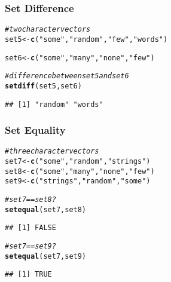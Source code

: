 \documentclass[12pt]{beamer}\usepackage[]{graphicx}\usepackage[]{color}
\makeatletter
\newcommand{\hlstr}[1]{\textcolor[rgb]{0.192,0.494,0.8}{#1}}%
\newcommand{\hlcom}[1]{\textcolor[rgb]{0.678,0.584,0.686}{\textit{#1}}}%
\newcommand{\hlstd}[1]{\textcolor[rgb]{0.345,0.345,0.345}{#1}}%
\newcommand{\hlkwb}[1]{\textcolor[rgb]{0.69,0.353,0.396}{#1}}%
\newcommand{\hlkwd}[1]{\textcolor[rgb]{0.737,0.353,0.396}{\textbf{#1}}}%
\newenvironment{kframe}{%
 \def\at@end@of@kframe{}%
 \ifinner\ifhmode%
  \def\at@end@of@kframe{\end{minipage}}%
  \begin{minipage}{\columnwidth}%
 \fi\fi%
 \def\FrameCommand##1{\hskip\@totalleftmargin \hskip-\fboxsep
 \colorbox{shadecolor}{##1}\hskip-\fboxsep
     \hskip-\linewidth \hskip-\@totalleftmargin \hskip\columnwidth}%
 \MakeFramed {\advance\hsize-\width
   \@totalleftmargin\z@ \linewidth\hsize
   \@setminipage}}%
 {\par\unskip\endMakeFramed%
 \at@end@of@kframe}
\newenvironment{knitrout}{}{} %
\makeatother
\begin{document}

\begin{frame}[fragile]
\frametitle{Set Difference}

\begin{knitrout}\footnotesize
{}\color{fgcolor}\begin{kframe}
\begin{alltt}
\hlcom{# two character vectors}
\hlstd{set5} \hlkwb{<-} \hlkwd{c}\hlstd{(}\hlstr{"some"}\hlstd{,} \hlstr{"random"}\hlstd{,} \hlstr{"few"}\hlstd{,} \hlstr{"words"}\hlstd{)}

\hlstd{set6} \hlkwb{<-} \hlkwd{c}\hlstd{(}\hlstr{"some"}\hlstd{,} \hlstr{"many"}\hlstd{,} \hlstr{"none"}\hlstd{,} \hlstr{"few"}\hlstd{)}

\hlcom{# difference between set5 and set6}
\hlkwd{setdiff}\hlstd{(set5, set6)}
\end{alltt}
\begin{verbatim}
## [1] "random" "words"
\end{verbatim}
\end{kframe}
\end{knitrout}

\end{frame}


\begin{frame}[fragile]
\frametitle{Set Equality}

\begin{knitrout}\footnotesize
{}\color{fgcolor}\begin{kframe}
\begin{alltt}
\hlcom{# three character vectors}
\hlstd{set7} \hlkwb{<-} \hlkwd{c}\hlstd{(}\hlstr{"some"}\hlstd{,} \hlstr{"random"}\hlstd{,} \hlstr{"strings"}\hlstd{)}
\hlstd{set8} \hlkwb{<-} \hlkwd{c}\hlstd{(}\hlstr{"some"}\hlstd{,} \hlstr{"many"}\hlstd{,} \hlstr{"none"}\hlstd{,} \hlstr{"few"}\hlstd{)}
\hlstd{set9} \hlkwb{<-} \hlkwd{c}\hlstd{(}\hlstr{"strings"}\hlstd{,} \hlstr{"random"}\hlstd{,} \hlstr{"some"}\hlstd{)}

\hlcom{# set7 == set8?}
\hlkwd{setequal}\hlstd{(set7, set8)}
\end{alltt}
\begin{verbatim}
## [1] FALSE
\end{verbatim}
\begin{alltt}
\hlcom{# set7 == set9?}
\hlkwd{setequal}\hlstd{(set7, set9)}
\end{alltt}
\begin{verbatim}
## [1] TRUE
\end{verbatim}
\end{kframe}
\end{knitrout}

\end{frame}
\end{document}
